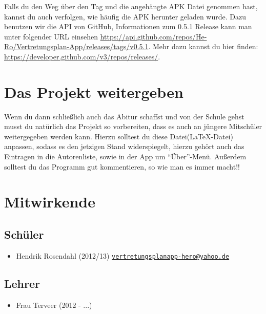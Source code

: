 \documentclass[12pt,headsepline]{scrartcl}
\begin{document}
Falls du den Weg über den Tag und die angehängte APK Datei genommen hast, kannst du auch verfolgen, wie häufig die APK herunter geladen wurde.
Dazu benutzen wir die API von GitHub, Informationen zum 0.5.1 Release kann man unter folgender URL einsehen \url{https://api.github.com/repos/He-Ro/Vertretungsplan-App/releases/tags/v0.5.1}.
Mehr dazu kannst du hier finden: \url{https://developer.github.com/v3/repos/releases/}.

\section{Das Projekt weitergeben}
Wenn du dann schließlich auch das Abitur schaffst und von der Schule gehst musst du natürlich das Projekt so vorbereiten, dass es auch an jüngere Mitschüler weitergegeben werden kann. Hierzu solltest du diese Datei(\LaTeX-Datei) anpassen, sodass es den jetzigen Stand widerspiegelt, hierzu gehört auch das Eintragen in die Autorenliste, sowie in der App um ``Über''-Menü. Außerdem solltest du das Programm gut kommentieren, so wie man es immer macht!!

\section{Mitwirkende}
\subsection{Schüler}
\begin{itemize}
 \item Hendrik Rosendahl (2012/13) \href{mailto:vertretungsplanapp-hero@yahoo.de?subject=Vertretungsplan-App}{\texttt{vertretungsplanapp-hero@yahoo.de}}
\end{itemize}
\subsection{Lehrer}
\begin{itemize}
 \item Frau Terveer (2012 - ...)
\end{itemize}
\end{document}
